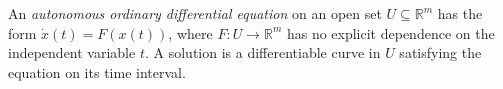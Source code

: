 
An \emph{autonomous ordinary differential equation} on an open set $U\subseteq\mathbb R^m$ has the form $\dot x(t)=F(x(t))$, where $F:U\to\mathbb R^m$ has no explicit dependence on the independent variable $t$. A solution is a differentiable curve in $U$ satisfying the equation on its time interval.

